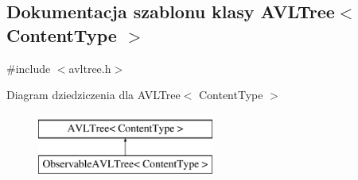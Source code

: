 \hypertarget{class_a_v_l_tree}{\subsection{Dokumentacja szablonu klasy A\-V\-L\-Tree$<$ Content\-Type $>$}
\label{class_a_v_l_tree}
}


{\ttfamily \#include $<$avltree.\-h$>$}

Diagram dziedziczenia dla A\-V\-L\-Tree$<$ Content\-Type $>$\begin{figure}[H]
\begin{center}
\leavevmode
\includegraphics[height=2.000000cm]{class_a_v_l_tree}
\end{center}
\end{figure}

